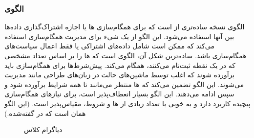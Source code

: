\subsubsection{الگوی }
\label{archConRendezSec}
\begin{RTL}
الگوی  \cite{ref4} نسخه
ساده‌تری از  است
که برای همگام‌سازی ها یا اجازه اشتراک‌گذاری داده‌ها بین آنها استفاده می‌شود.
این الگو از یک شیء  برای مدیریت همگام‌سازی استفاده می‌کند
که ممکن است شامل داده‌های اشتراکی یا فقط اعمال سیاست‌های همگام‌سازی باشد.
ساده‌ترین شکل آن، الگوی  است که
ها را بر اساس تعداد مشخصی که در یک نقطه ثبت‌نام می‌کنند،
همگام می‌کند. پیش‌شرط‌ها برای همگام‌سازی باید برآورده شوند که
اغلب توسط ماشین‌های حالت در زبان‌های طراحی مانند  مدیریت می‌شوند.
این الگو تضمین می‌کند که ها منتظر می‌مانند
تا همه شرایط برآورده شود و سپس ادامه می‌دهند.
این الگو بسیار انعطاف‌پذیر است، برای نیازهای همگام‌سازی پیچیده کاربرد دارد
و به خوبی با تعداد زیادی از ها و شروط، مقیاس‌پذیر است.
(این الگو همان  است
که در \cite{ref1} گفته‌شده.)
\end{RTL}
\begin{figure}[h!]
\centering
{}
\caption{دیاگرام کلاس }
\label{archConRendezClassDiag}
\end{figure}